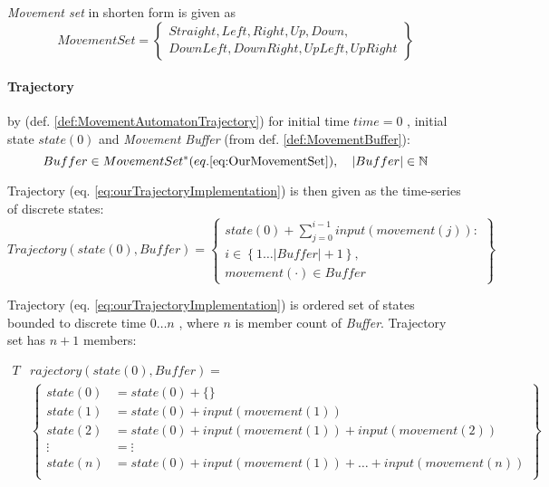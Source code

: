 \begin{note}
    \emph{Movement set} in shorten form is given as
    \begin{equation}\label{eq:OurMovementSet}
        Movement Set= \left\{
        \begin{gathered}
            Straight, Left,Right, Up, Down,\\
            Down Left, Down Right,  Up Left,   Up Right
        \end{gathered}
        \right\}
    \end{equation}
\end{note}

\paragraph{Trajectory} by (def. \ref{def:MovementAutomatonTrajectory}) for initial time $time = 0$ , initial state $state(0)$ and \emph{Movement Buffer} (from def. \ref{def:MovementBuffer}):
\begin{equation}\label{eq:ourBuffer}
    Buffer \in Movement Set^* (eq. \ref{eq:OurMovementSet}), \quad  |Buffer| \in \mathbb{N}
\end{equation}

Trajectory (eq. \ref{eq:ourTrajectoryImplementation}) is then given as the time-series of discrete states:
\begin{equation}\label{eq:ourTrajectoryImplementation}
    Trajectory(state(0),Buffer)= \left\{\begin{gathered}state(0)+\sum_{j=0}^{i-1} input(movement(j)):\\i \in\left\{1\dots |Buffer|+1\right\}, \\movement(\cdot) \in Buffer\end{gathered}\right\}
\end{equation}

Trajectory (eq. \ref{eq:ourTrajectoryImplementation}) is ordered set of states bounded to discrete time $0\dots n$ , where $n$ is member count of \emph{Buffer}. Trajectory set has $n+1$ members:

\begin{equation}
    \begin{aligned}
    T&rajectory(state(0),Buffer)=\\
        &\left\{
        \begin{aligned}
            state(0) &= state(0) + \{\}\\
            state(1) &= state(0) + input(movement(1))\\
            state(2) &= state(0) + input(movement(1)) +input(movement(2))\\
             \vdots  &= \vdots\\
            state(n) &= state(0) + input(movement(1))+\dots+input(movement(n))\\
        \end{aligned}
        \right\}
    \end{aligned}
\end{equation}

